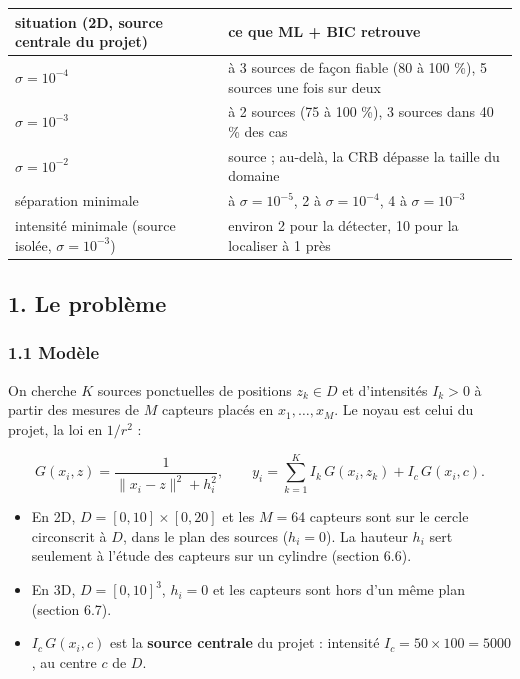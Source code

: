 \documentclass[
  french,
]{article}
\newcounter{none} %
\providecommand{\tightlist}{%
  \setlength{\itemsep}{0pt}\setlength{\parskip}{0pt}}
\begin{document}
{\def\LTcaptype{none} %
\begin{longtable}[]{@{}
  >{\raggedright\arraybackslash}p{}
  >{\raggedright\arraybackslash}p{}@{}}
\toprule\noalign{}
\begin{minipage}[b]{\linewidth}\raggedright
situation (2D, source centrale du projet)
\end{minipage} & \begin{minipage}[b]{\linewidth}\raggedright
ce que ML + BIC retrouve
\end{minipage} \\
\midrule\noalign{}
\endhead
\bottomrule\noalign{}
\endlastfoot
\(\sigma = 10^{-4}\) & 1 à 3 sources de façon fiable (80 à 100 \%), 5
sources une fois sur deux \\
\(\sigma = 10^{-3}\) & 1 à 2 sources (75 à 100 \%), 3 sources dans 40 \%
des cas \\
\(\sigma = 10^{-2}\) & 1 source ; au-delà, la CRB dépasse la taille du
domaine \\
séparation minimale & 1 à \(\sigma = 10^{-5}\), 2 à
\(\sigma = 10^{-4}\), 4 à \(\sigma = 10^{-3}\) \\
intensité minimale (source isolée, \(\sigma = 10^{-3}\)) & environ 2
pour la détecter, 10 pour la localiser à 1 près \\
\end{longtable}
}

\subsection{1. Le problème}\label{le-probluxe8me}

\subsubsection{1.1 Modèle}\label{moduxe8le}

On cherche \(K\) sources ponctuelles de positions \(z_k\in D\) et
d'intensités \(I_k > 0\) à partir des mesures de \(M\) capteurs placés
en \(x_1,\dots,x_M\). Le noyau est celui du projet, la loi en \(1/r^2\)
:

\[
G(x_i, z) = \frac{1}{\lVert x_i - z\rVert^2 + h_i^2},
\qquad
y_i = \sum_{k=1}^{K} I_k\,G(x_i, z_k) + I_c\,G(x_i, c) .
\]

\begin{itemize}
\tightlist
\item
  En 2D, \(D = [0,10]\times[0,20]\) et les \(M = 64\) capteurs sont sur
  le cercle circonscrit à \(D\), dans le plan des sources (\(h_i = 0\)).
  La hauteur \(h_i\) sert seulement à l'étude des capteurs sur un
  cylindre (section 6.6).
\item
  En 3D, \(D = [0,10]^3\), \(h_i = 0\) et les capteurs sont hors d'un
  même plan (section 6.7).
\item
  \(I_c\,G(x_i, c)\) est la \textbf{source centrale} du projet :
  intensité \(I_c = 50\times 100 = 5000\), au centre \(c\) de \(D\).
\end{itemize}
\end{document}
